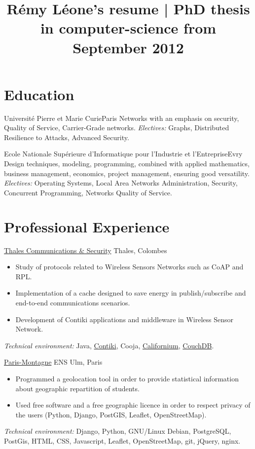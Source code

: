 \documentclass[letterpaper,final]{moderncv}
\title{Rémy Léone's resume | PhD thesis in computer-science from September 2012}
\begin{document}
\maketitle

\section{Education}

{Université Pierre et Marie Curie}{Paris}{}
{Networks with an emphasis on security, Quality of Service, Carrier-Grade networks.
  \newline
\textit{Electives:} Graphs, Distributed Resilience to Attacks, Advanced Security.}

{Ecole Nationale Supérieure d'Informatique pour l'Industrie et l'Entreprise}{Evry}{}
{Design techniques, modeling, programming, combined with applied mathematics, business management, economics,
  project management, ensuring good versatility.
  \newline
  \textit{Electives:} Operating Systems, Local Area Networks Administration, Security,
Concurrent Programming, Networks Quality of Service.}

\section{Professional Experience}

{
  \href{www.thalesgroup.com}{Thales Communications \& Security}
}
{Thales, Colombes}
{}{
  \begin{itemize}
    \item Study of protocols related to Wireless Sensors Networks such as CoAP and RPL.
    \item Implementation of a cache designed to save energy in publish/subscribe and end-to-end communications scenarios.
    \item Development of Contiki applications and middleware in Wireless Sensor Network.
  \end{itemize}
  \textit{Technical environment:} Java, \href{www.contiki-os.org}{Contiki},
  Cooja, \href{https://people.inf.ethz.ch/mkovatsc/californium.php}{Californium},
  \href{couchdb.apache.org}{CouchDB}.
}

{\href{www.paris-montagne.org}{Paris-Montagne}}
{ENS Ulm, Paris}{}{
  \begin{itemize}
    \item Programmed a geolocation tool in order to provide statistical information
      about geographic repartition of students.
    \item Used free software and a free geographic licence in order
      to respect privacy of the users (Python, Django, PostGIS, Leaflet, OpenStreetMap).
  \end{itemize}
  \textit{Technical environment:} Django, Python, GNU/Linux Debian, PostgreSQL,
PostGis, HTML, CSS, Javascript, Leaflet, OpenStreetMap, git, jQuery, nginx.}
\end{document}
